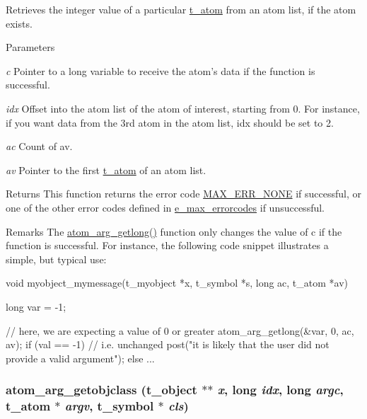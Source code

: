 Retrieves the integer value of a particular \hyperlink{structt__atom}{t\_\-atom} from an atom list, if the atom exists. 
\begin{DoxyParams}{Parameters}
\item[{\em c}]Pointer to a long variable to receive the atom's data if the function is successful. \item[{\em idx}]Offset into the atom list of the atom of interest, starting from 0. For instance, if you want data from the 3rd atom in the atom list, {\ttfamily idx} should be set to 2. \item[{\em ac}]Count of av. \item[{\em av}]Pointer to the first \hyperlink{structt__atom}{t\_\-atom} of an atom list.\end{DoxyParams}
\begin{DoxyReturn}{Returns}
This function returns the error code \hyperlink{group__misc_gga0764dd6c02b76cca7d053ae50555d69da6d22f77fef8b1e1b074cef5d29d935fd}{MAX\_\-ERR\_\-NONE} if successful, or one of the other error codes defined in \hyperlink{group__misc_ga0764dd6c02b76cca7d053ae50555d69d}{e\_\-max\_\-errorcodes} if unsuccessful.
\end{DoxyReturn}
\begin{DoxyRemark}{Remarks}
The \hyperlink{group__atom_gaba53e6f86741dea07cff414b9b5d6a8b}{atom\_\-arg\_\-getlong()} function only changes the value of {\ttfamily c} if the function is successful. For instance, the following code snippet illustrates a simple, but typical use: 
\begin{DoxyCode}
    void myobject_mymessage(t_myobject *x, t_symbol *s, long ac, t_atom *av)
    {
        long var = -1;

        // here, we are expecting a value of 0 or greater
        atom_arg_getlong(&var, 0, ac, av);
        if (val == -1) // i.e. unchanged
            post("it is likely that the user did not provide a valid argument");
        else {
            ...
        }
    }
\end{DoxyCode}
 
\end{DoxyRemark}
\hypertarget{group__atom_ga2c50571450b200933f47ad6c7c411388}{
\subsubsection[{atom\_\-arg\_\-getobjclass}]{ atom\_\-arg\_\-getobjclass ({\bf t\_\-object} $\ast$$\ast$ {\em x}, \/  long {\em idx}, \/  long {\em argc}, \/  {\bf t\_\-atom} $\ast$ {\em argv}, \/  {\bf t\_\-symbol} $\ast$ {\em cls})}}
\label{group__atom_ga2c50571450b200933f47ad6c7c411388}


